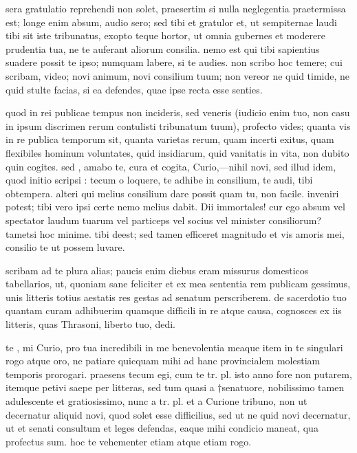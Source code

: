 


 sera gratulatio reprehendi non solet, praesertim si nulla neglegentia praetermissa est; longe enim absum, audio sero; sed tibi et gratulor et, ut sempiternae laudi tibi sit iste tribunatus, exopto teque hortor, ut omnia gubernes et moderere prudentia tua, ne te auferant aliorum consilia. nemo est qui tibi sapientius suadere possit te ipso; numquam labere, si te audies. non scribo hoc temere; cui scribam, video; novi animum, novi consilium tuum; non vereor ne quid timide, ne quid stulte facias, si ea defendes, quae ipse recta esse senties.

 quod in rei publicae tempus non incideris, sed veneris (iudicio enim tuo, non casu in ipsum discrimen rerum contulisti tribunatum tuum), profecto vides; quanta vis in re publica temporum sit, quanta varietas rerum, quam incerti exitus, quam flexibiles hominum voluntates, quid insidiarum, quid vanitatis in vita, non dubito quin cogites. sed , amabo te, cura et cogita, Curio,—nihil novi, sed illud idem, quod initio scripsi : tecum o loquere, te adhibe in consilium, te audi, tibi obtempera. alteri qui melius consilium dare possit quam tu, non facile. inveniri potest; tibi vero ipsi certe nemo melius dabit. Dii immortales! cur ego absum vel spectator laudum tuarum vel particeps vel socius vel minister consiliorum? tametsi hoc minime. tibi deest; sed tamen efficeret magnitudo et vis amoris mei, consilio te ut possem luvare.

 scribam ad te plura alias; paucis enim diebus eram missurus domesticos tabellarios, ut, quoniam sane feliciter et ex mea sententia rem publicam gessimus, unis litteris totius aestatis res gestas ad senatum perscriberem. de sacerdotio tuo quantam curam adhibuerim quamque difficili in re atque causa, cognosces ex iis litteris, quas Thrasoni, liberto tuo, dedi.

 te , mi Curio, pro tua incredibili in me benevolentia meaque item in te singulari rogo atque oro, ne patiare quicquam mihi ad hanc provincialem molestiam temporis prorogari. praesens tecum egi, cum te tr. pl. isto anno fore non putarem, itemque petivi saepe per litteras, sed tum quasi a †senatuore, nobilissimo tamen adulescente et gratiosissimo, nunc a tr. pl. et a Curione tribuno, non ut decernatur aliquid novi, quod solet esse difficilius, sed ut ne quid novi decernatur, ut et senati consultum et leges defendas, eaque mihi condicio maneat, qua profectus sum. hoc te vehementer etiam atque etiam rogo.
